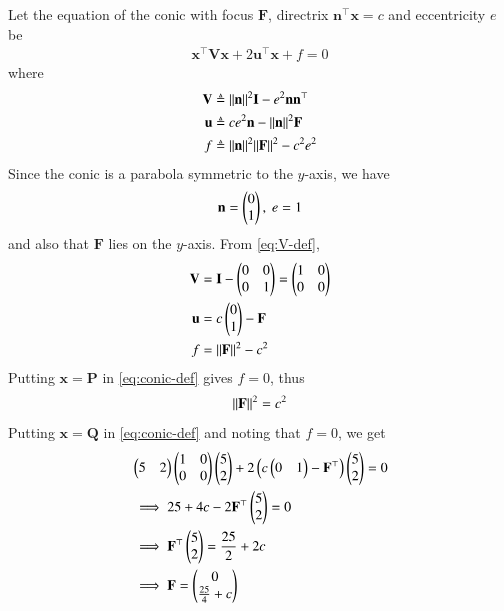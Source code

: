 \documentclass[journal,12pt,twocolumn]{IEEEtran}
\renewcommand{\vec}[1]{\boldsymbol{\mathbf{#1}}}
\begin{document}
\begin{enumerate}
    \solution Let the equation of the conic with focus $\vec{F}$, directrix
    $\vec{n}^\top\vec{x} = c$ and eccentricity $e$ be
    \begin{align}
        \vec{x}^\top\vec{V}\vec{x} + 2\vec{u}^\top\vec{x} + f = 0
        \label{eq:conic-def}
    \end{align}
    where
    \begin{align}
        \vec{V} &\triangleq \norm{\vec{n}}^2\vec{I} - e^2\vec{n}\vec{n}^\top \label{eq:V-def} \\
        \vec{u} &\triangleq ce^2\vec{n} - \norm{\vec{n}}^2\vec{F} \label{eq:u-def} \\
        f &\triangleq \norm{\vec{n}}^2\norm{\vec{F}}^2 - c^2e^2 \label{eq:f-def}
    \end{align}
    Since the conic is a parabola symmetric to the $y$-axis, we have
    \begin{align}
        \vec{n} = \myvec{0\\1},\ e = 1
    \end{align}
    and also that $\vec{F}$ lies on the $y$-axis. From \eqref{eq:V-def},
    \begin{align}
        \vec{V} &= \vec{I} - \myvec{0&0\\0&1} = \myvec{1&0\\0&0} \\
        \vec{u} &= c\myvec{0\\1} - \vec{F} \\
        f &= \norm{\vec{F}}^2 - c^2
    \end{align}
    Putting $\vec{x} = \vec{P}$ in \eqref{eq:conic-def} gives $f = 0$, thus 
    \begin{align}
        \norm{\vec{F}}^2 = c^2
        \label{eq:F-c}
    \end{align}
    Putting $\vec{x} = \vec{Q}$ in \eqref{eq:conic-def} and noting that $f = 0$, 
    we get
    \begin{align}
        &\myvec{5&2}\myvec{1&0\\0&0}\myvec{5\\2} + 2\brak{c\myvec{0&1}-\vec{F}^\top}\myvec{5\\2} = 0 \\
        &\implies 25 + 4c - 2\vec{F}^\top\myvec{5\\2} = 0 \\
        &\implies \vec{F}^\top\myvec{5\\2} = \frac{25}{2} + 2c \label{eq:p1} \\
        &\implies \vec{F} = \myvec{0\\\frac{25}{4}+c} \label{eq:F-coords}

\end{align}
\end{enumerate}
\end{document}
